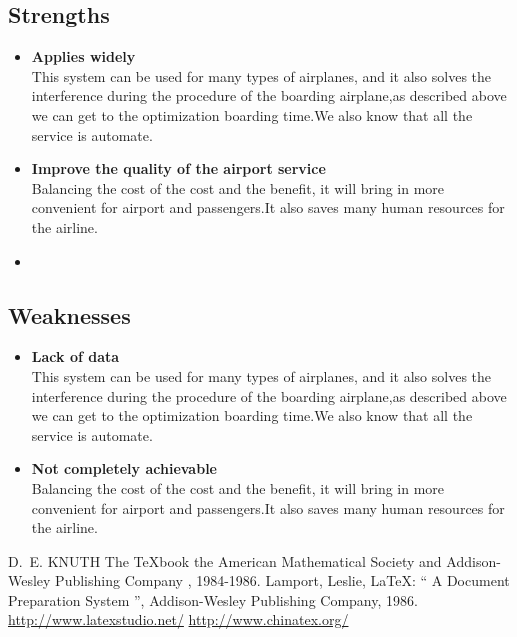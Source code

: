 \documentclass{mcmthesis}
\begin{document}
\subsection{Strengths}
\begin{itemize}
\item \textbf{Applies widely}\\
This  system can be used for many types of airplanes, and it also
solves the interference during  the procedure of the boarding
airplane,as described above we can get to the  optimization
boarding time.We also know that all the service is automate.
\item \textbf{Improve the quality of the airport service}\\
Balancing the cost of the cost and the benefit, it will bring in
more convenient  for airport and passengers.It also saves many
human resources for the airline. 
\item \textbf{}
\end{itemize}

\subsection{Weaknesses}
\begin{itemize}
\item \textbf{Lack of data}\\
This  system can be used for many types of airplanes, and it also
solves the interference during  the procedure of the boarding
airplane,as described above we can get to the  optimization
boarding time.We also know that all the service is automate.
\item \textbf{Not completely achievable}\\
Balancing the cost of the cost and the benefit, it will bring in
more convenient  for airport and passengers.It also saves many
human resources for the airline. 
\end{itemize}

\begin{thebibliography}{99}
 D.~E. KNUTH   The \TeX{}book  the American
Mathematical Society and Addison-Wesley
Publishing Company , 1984-1986.
Lamport, Leslie,  \LaTeX{}: `` A Document Preparation System '',
Addison-Wesley Publishing Company, 1986.
\url{http://www.latexstudio.net/}
\url{http://www.chinatex.org/}
\end{thebibliography}
\end{document}
